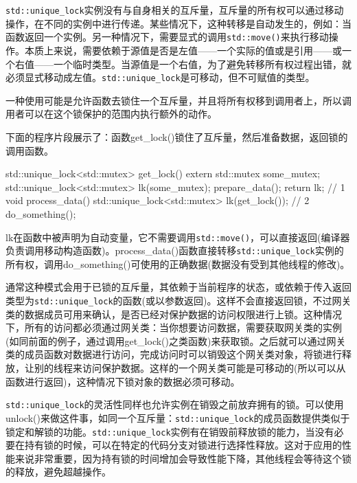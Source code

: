 
\texttt{std::unique\_lock}实例没有与自身相关的互斥量，互斥量的所有权可以通过移动操作，在不同的实例中进行传递。某些情况下，这种转移是自动发生的，例如：当函数返回一个实例。另一种情况下，需要显式的调用\texttt{std::move()}来执行移动操作。本质上来说，需要依赖于源值是否是左值——一个实际的值或是引用——或一个右值——一个临时类型。当源值是一个右值，为了避免转移所有权过程出错，就必须显式移动成左值。\texttt{std::unique\_lock}是可移动，但不可赋值的类型。

一种使用可能是允许函数去锁住一个互斥量，并且将所有权移到调用者上，所以调用者可以在这个锁保护的范围内执行额外的动作。

下面的程序片段展示了：函数get\_lock()锁住了互斥量，然后准备数据，返回锁的调用函数。

\begin{cpp}
std::unique_lock<std::mutex> get_lock()
{
  extern std::mutex some_mutex;
  std::unique_lock<std::mutex> lk(some_mutex);
  prepare_data();
  return lk;  // 1
}
void process_data()
{
  std::unique_lock<std::mutex> lk(get_lock());  // 2
  do_something();
}
\end{cpp}

lk在函数中被声明为自动变量，它不需要调用\texttt{std::move()}，可以直接返回(编译器负责调用移动构造函数)。process\_data()函数直接转移\texttt{std::unique\_lock}实例的所有权，调用do\_something()可使用的正确数据(数据没有受到其他线程的修改)。

通常这种模式会用于已锁的互斥量，其依赖于当前程序的状态，或依赖于传入返回类型为\texttt{std::unique\_lock}的函数(或以参数返回)。这样不会直接返回锁，不过网关类的数据成员可用来确认，是否已经对保护数据的访问权限进行上锁。这种情况下，所有的访问都必须通过网关类：当你想要访问数据，需要获取网关类的实例(如同前面的例子，通过调用get\_lock()之类函数)来获取锁。之后就可以通过网关类的成员函数对数据进行访问，完成访问时可以销毁这个网关类对象，将锁进行释放，让别的线程来访问保护数据。这样的一个网关类可能是可移动的(所以可以从函数进行返回)，这种情况下锁对象的数据必须可移动。

\texttt{std::unique\_lock}的灵活性同样也允许实例在销毁之前放弃拥有的锁。可以使用unlock()来做这件事，如同一个互斥量：\texttt{std::unique\_lock}的成员函数提供类似于锁定和解锁的功能。\texttt{std::unique\_lock}实例有在销毁前释放锁的能力，当没有必要在持有锁的时候，可以在特定的代码分支对锁进行选择性释放。这对于应用的性能来说非常重要，因为持有锁的时间增加会导致性能下降，其他线程会等待这个锁的释放，避免超越操作。

